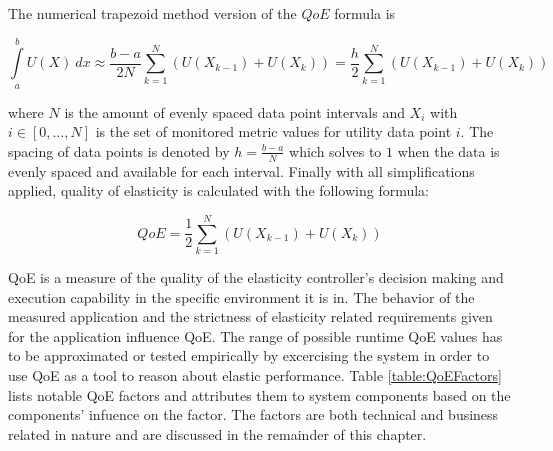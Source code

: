\documentclass[english]{tktltiki2}
\theoremstyle{definition}
\theoremstyle{remark}
\begin{document}
The numerical trapezoid method version of the $QoE$ formula is

\begin{equation}
\int\limits_a^b U(X)~dx \approx 
\frac{b-a}{2N}\sum\limits_{k=1}^N (U(X_{k-1}) + U(X_{k})) = 
\frac{h}{2}\sum\limits_{k=1}^N (U(X_{k-1}) + U(X_{k})) 
\label{qoefunctionnumerical}
\end{equation}

where $N$ is the amount of evenly spaced data point intervals and $X_{i}$ with
$i \in [0, \dots, N]$ is the set of monitored metric values for utility data
point $i$. The spacing of data points is denoted by $h = \frac{b-a}{N}$ which
solves to $1$ when the data is evenly spaced and available for each interval.
Finally with all simplifications applied, quality of elasticity is calculated
with the following formula:

\begin{equation}
QoE = \frac{1}{2}\sum\limits_{k=1}^N (U(X_{k-1}) + U(X_{k})) \label{qoefunctionnumericalfinal}
\end{equation}

QoE is a measure of the quality of the elasticity controller's decision making
and execution capability in the specific environment it is in. The behavior of
the measured application and the strictness of elasticity related requirements
given for the application influence QoE. The range of possible runtime QoE
values has to be approximated or tested empirically by excercising the system in
order to use QoE as a tool to reason about elastic performance. Table
\ref{table:QoEFactors} lists notable QoE factors and attributes them to system
components based on the components' infuence on the factor. The factors are both
technical and business related in nature and are discussed in the remainder of
this chapter.
\end{document}
